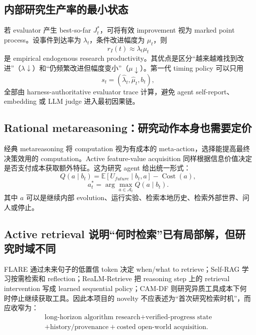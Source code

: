 \documentclass[11pt,a4paper]{ctexart}
\newcommand{\E}{\mathbb{E}}
\newcommand{\A}{\mathcal{A}}
\newcommand{\Cost}{\operatorname{Cost}}
\begin{document}
\subsection{内部研究生产率的最小状态}

若 evaluator 产生 best-so-far $J_t^*$，可将有效 improvement 视为 marked point process。设事件到达率为 $\lambda_t$，条件改进幅度为 $\mu_t$，则
\begin{equation}
 r_I(t)\approx\lambda_t\mu_t
\end{equation}
是 empirical endogenous research productivity。其优点是区分“越来越难找到改进”（$\lambda\downarrow$）和“仍频繁改进但幅度变小”（$\mu\downarrow$）。第一代 timing policy 可以只用
\begin{equation}
 s_t=(\hat\lambda_t,\hat\mu_t,b_t),
\end{equation}
全部由 harness-authoritative evaluator trace 计算，避免 agent self-report、embedding 或 LLM judge 进入最初因果链。

\subsection{Rational metareasoning：研究动作本身也需要定价}

经典 metareasoning 将 computation 视为有成本的 meta-action，选择能提高最终决策效用的 computation\parencite{russell1991metareasoning,hay2012selecting}。Active feature-value acquisition 同样根据信息价值决定是否支付成本获取额外特征\parencite{saar2009activefeature}。这为研究 agent 给出统一形式：
\begin{equation}
 Q(a\mid b_t)=\E[U_{future}\mid b_t,a]-\Cost(a),
\end{equation}
\begin{equation}
 a_t^*=\arg\max_{a\in\A_t}Q(a\mid b_t).
\end{equation}
其中 $a$ 可以是继续内部 evolution、运行实验、检索本地历史、检索外部世界、问人或停止。

\subsection{Active retrieval 说明“何时检索”已有局部解，但研究时域不同}

FLARE 通过未来句子的低置信 token 决定 when/what to retrieve\parencite{jiang2023flare}；Self-RAG 学习按需检索和 reflection\parencite{asai2024selfrag}；ReaLM-Retrieve 把 reasoning step 上的 retrieval intervention 写成 learned sequential policy\parencite{guo2026realm}；CAM-DF 则研究异质工具成本下何时停止继续获取工具\parencite{feng2026camdf}。因此本项目的 novelty 不应表述为“首次研究检索时机”，而应收窄为：
\begin{equation}
\boxed{\begin{gathered}
\text{long-horizon algorithm research}+\text{verified-progress state}\\
+\text{history/provenance}+\text{costed open-world acquisition}.
\end{gathered}}
\end{equation}
\end{document}

